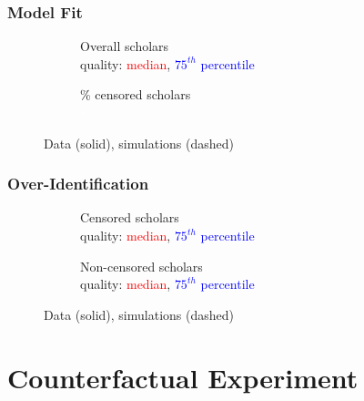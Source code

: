 \documentclass[aspectratio=169,red,12pt]{beamer}
\begin{document}
\begin{frame}[label=fit]
	\frametitle{Model Fit}
  \begin{figure}[htp]	
  	\begin{subfigure}{.49\textwidth}
  		\centering
  		\caption{Overall scholars\\quality: \textcolor{red}{median}, \textcolor{blue}{$75^{th}$ percentile}}
  		\label{sf:cdivbil}
  		\scalebox{0.35}{ }
  	\end{subfigure}
  	\begin{subfigure}{.49\textwidth}
  		\centering
  		\caption{\% censored scholars\\\textcolor{white}{a}}
  		\label{sf:cdivbil2}
  		\scalebox{0.35}{ }
  	\end{subfigure}
  \caption{Data (solid), simulations  (dashed)}

  	
  
  \end{figure}

\end{frame}


\begin{frame}
	\frametitle{Over-Identification}
	\begin{figure}
		\centering
		\begin{subfigure}{.49\textwidth}
			\centering
			\caption{Censored scholars\\quality: \textcolor{red}{median}, \textcolor{blue}{$75^{th}$ percentile}}
			\label{sf:cdivuni}
			\scalebox{0.35}{ }
		\end{subfigure}
		\begin{subfigure}{.49\textwidth}
			\centering
			\caption{Non-censored scholars\\quality: \textcolor{red}{median}, \textcolor{blue}{$75^{th}$ percentile}}
			\label{sf:cdivuni2}
			\scalebox{0.35}{ }
		\end{subfigure}
	\caption{Data (solid), simulations  (dashed)}
	\end{figure}
	
\end{frame}



\section{Counterfactual Experiment}
\end{document}
